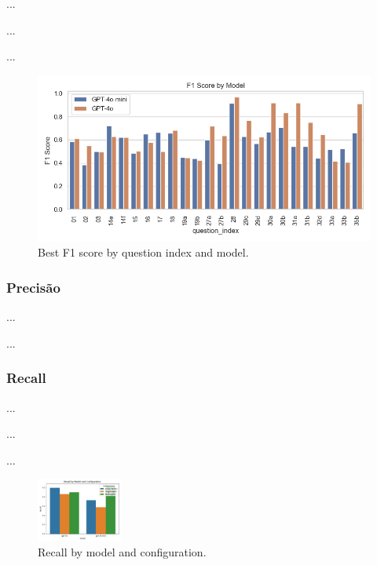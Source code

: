                ...

                ...

                
                ...

                
                \begin{figure}
                    \centering
                    \includegraphics[width=0.75\linewidth]{images_exp2/best_f1_by_question_index_and_model.png}
                    \caption{Best F1 score by question index and model.}
                    \label{fig:best_f1_by_question_index_and_model}
                \end{figure}


            \subsubsection{Precisão}

                ...


                ...

            
            \subsubsection{Recall}
            
                ...

                ...

                ...
                
                \begin{figure}[h!]
                    \centering              
                    \includegraphics[width=0.25\textwidth]{images_part_2/model_recall_model_configuration.png}
                    \caption{Recall by model and configuration.}
                    \label{fig:model_recall_model_configuration}
                \end{figure}

